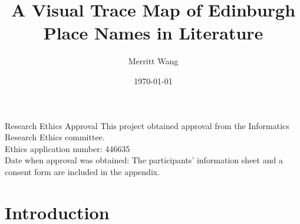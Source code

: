\documentclass[logo,msc]{infthesis}
\begin{document}
\begin{preliminary}

\title{A Visual Trace Map of Edinburgh Place Names in Literature}
\author{Merritt Wang}
\date{\today}

\abstract{
}

\maketitle

\newenvironment{ethics}
   {\begin{frontenv}{Research Ethics Approval}{\LARGE}}
   {\end{frontenv}\newpage}

\begin{ethics}
This project obtained approval from the Informatics Research Ethics committee.\\
Ethics application number: 446635\\
Date when approval was obtained: %
The participants' information sheet and a consent form are included in the appendix.\\
\standarddeclaration
\end{ethics}

\begin{acknowledgements}
\end{acknowledgements}

\tableofcontents
\listoffigures

\end{preliminary}


\chapter{Introduction}
\end{document}
